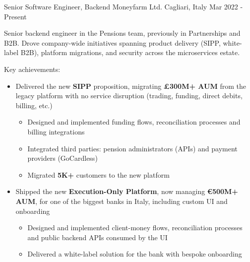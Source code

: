 
\begin{cventries}

    \cventryextendedwithdoubletags
    	{Senior Software Engineer, Backend} %
    	{Moneyfarm Ltd. } %
    	{Cagliari, Italy} %
    	{Mar 2022 - Present} %
    	{
		\begin{cvitem}
			Senior backend engineer in the Pensions team, previously in Partnerships and B2B.
			Drove company-wide initiatives spanning product delivery (SIPP, white-label B2B), platform migrations, and security across the microservices estate.
		\end{cvitem}
    	}
    	{
			\begin{cvitems}
				\item Key achievements:
					\begin{itemize}
						\item Delivered the new \textbf{SIPP} proposition, migrating \textbf{£300M+ AUM} from the legacy platform with no service disruption (trading, funding, direct debits, billing, etc.)
							\begin{itemize}
								\item Designed and implemented funding flows, reconciliation processes and billing integrations
								\item Integrated third parties: pension administrators (APIs) and payment providers (GoCardless)
								\item Migrated \textbf{5K+} customers to the new platform
							\end{itemize}
						\item Shipped the new \textbf{Execution-Only Platform}, now managing \textbf{€500M+ AUM}, for one of the biggest banks in Italy, including custom UI and onboarding
							\begin{itemize}
								\item Designed and implemented client-money flows, reconciliation processes and public backend APIs consumed by the UI
								\item Delivered a white-label solution for the bank with bespoke onboarding

\end{itemize}
\end{itemize}
\end{cvitems}}
\end{cventries}
